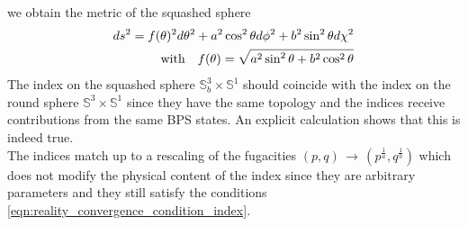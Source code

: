 we obtain the metric of the squashed sphere
\begin{align}
 d s^2 = f(\theta)^2 d \theta^2 + a^2 \cos^2 \theta d \phi ^2 + b^2 \sin^2 \theta d \chi^2 \\
\hbox{with} \quad f( \theta) = \sqrt{ a^2 \sin^2 \theta + b^2 \cos^2 \theta}
\end{align}
The index on the squashed sphere $\mathbb{S}_b^3 \times \mathbb{S}^1$ should coincide with the index on the round sphere $\mathbb{S}^3 \times \mathbb{S}^1$ since they have the same topology and the indices receive contributions from the same BPS states.
An explicit calculation \cite{Agarwal:2012hs} shows that this is indeed true. \\
The indices match up to a rescaling of the fugacities $(p,q) \, \rightarrow \, (p^{\frac{1}{a}}, q^{\frac{1}{b}})$ which does not modify the physical content of the index since they are arbitrary parameters and they still satisfy the conditions \eqref{eqn:reality_convergence_condition_index}.\\

